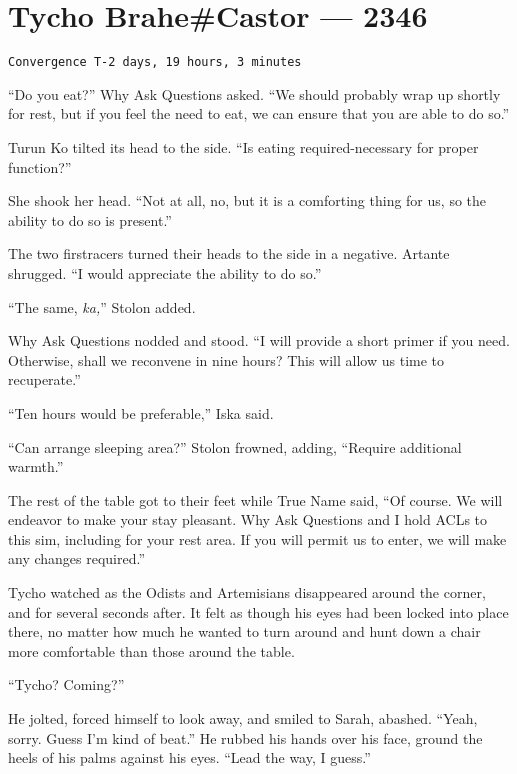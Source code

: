 \hypertarget{tycho-brahecastor-2346}{%
\chapter{Tycho Brahe\#Castor — 2346}\label{tycho-brahecastor-2346}}

\begin{verbatim}
Convergence T-2 days, 19 hours, 3 minutes
\end{verbatim}

``Do you eat?'' Why Ask Questions asked. ``We should probably wrap up shortly for rest, but if you feel the need to eat, we can ensure that you are able to do so.''

Turun Ko tilted its head to the side. ``Is eating required-necessary for proper function?''

She shook her head. ``Not at all, no, but it is a comforting thing for us, so the ability to do so is present.''

The two firstracers turned their heads to the side in a negative. Artante shrugged. ``I would appreciate the ability to do so.''

``The same, \emph{ka,}'' Stolon added.

Why Ask Questions nodded and stood. ``I will provide a short primer if you need. Otherwise, shall we reconvene in nine hours? This will allow us time to recuperate.''

``Ten hours would be preferable,'' Iska said.

``Can arrange sleeping area?'' Stolon frowned, adding, ``Require additional warmth.''

The rest of the table got to their feet while True Name said, ``Of course. We will endeavor to make your stay pleasant. Why Ask Questions and I hold ACLs to this sim, including for your rest area. If you will permit us to enter, we will make any changes required.''

Tycho watched as the Odists and Artemisians disappeared around the corner, and for several seconds after. It felt as though his eyes had been locked into place there, no matter how much he wanted to turn around and hunt down a chair more comfortable than those around the table.

``Tycho? Coming?''

He jolted, forced himself to look away, and smiled to Sarah, abashed. ``Yeah, sorry. Guess I'm kind of beat.'' He rubbed his hands over his face, ground the heels of his palms against his eyes. ``Lead the way, I guess.''

